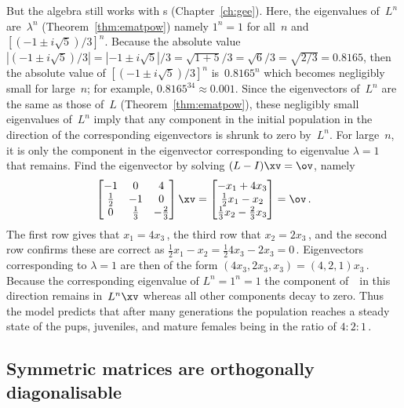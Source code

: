\begin{example}
\begin{solution}
But the algebra still works with s (Chapter~\ref{ch:gee}).
Here, the eigenvalues of~\(L^n\) are~\(\lambda^n\) (Theorem~\ref{thm:ematpow}) namely \(1^n=1\) for all~\(n\) and \([(-1\pm i\sqrt5)/3]^n\).
Because the absolute value \(|(-1\pm i\sqrt5)/3|
=|-1\pm i\sqrt5|/3=\sqrt{1+5}/3=\sqrt{6}/3=\sqrt{2/3}=0.8165\), then the absolute value of \([(-1\pm i\sqrt5)/3]^n\) is~\(0.8165^n\) which becomes negligibly small for large~\(n\); for example, \(0.8165^{34}\approx 0.001\).
Since the eigenvectors of~\(L^n\) are the same as those of~\(L\) (Theorem~\ref{thm:ematpow}), these negligibly small eigenvalues of~\(L^n\) imply that any component in the initial population in the direction of the corresponding eigenvectors is shrunk to zero by~\(L^n\).
For large~\(n\), it is only the component in the eigenvector corresponding to eigenvalue \(\lambda=1\) that remains.
Find the eigenvector by solving \((L-I)\xv=\ov\), namely
\begin{equation*}
\begin{bmatrix} -1&0&4\\\frac12&-1&0\\0&\frac13&-\frac23 \end{bmatrix}\xv=\begin{bmatrix} -x_1+4x_3\\ \frac12x_1-x_2\\\frac13x_2-\frac23x_3 \end{bmatrix}=\ov\,.
\end{equation*}
The first row gives that \(x_1=4x_3\)\,, the third row that \(x_2=2x_3\)\,, and the second row confirms these are correct as \(\frac12x_1-x_2=\frac124x_3-2x_3=0\)\,.
Eigenvectors corresponding to \(\lambda=1\) are then of the form \((4x_3,2x_3,x_3)=(4,2,1)x_3\)\,.
Because the corresponding eigenvalue of \(L^n=1^n=1\) the component of~\xv\ in this direction remains in~\(L^n\xv\) whereas all other components decay to zero.
Thus the model predicts that after many generations the population reaches a steady state of the pups, juveniles, and mature females being in the ratio of \(4:2:1\)\,.
\end{solution}
\end{example}




\subsection{Symmetric matrices are orthogonally diagonalisable}
\label{sec:smod}

